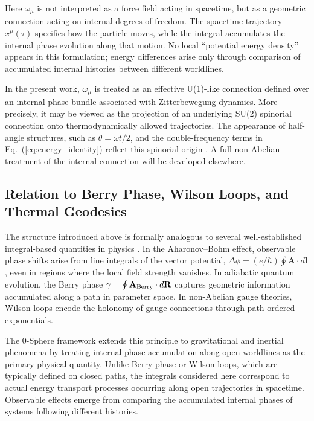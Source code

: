 \documentclass[%
 reprint,
 amsmath,amssymb,
 aps,
 prb,
]{revtex4-2}
\numberwithin{equation}{section}
\begin{document}
Here $\omega_\mu$ is not interpreted as a force field acting in spacetime, but as a geometric connection acting on internal degrees of freedom. The spacetime trajectory $x^\mu(\tau)$ specifies how the particle moves, while the integral accumulates the internal phase evolution along that motion. No local ``potential energy density'' appears in this formulation; energy differences arise only through comparison of accumulated internal histories between different worldlines.

In the present work, $\omega_\mu$ is treated as an effective U(1)-like connection defined over an internal phase bundle associated with Zitterbewegung dynamics. More precisely, it may be viewed as the projection of an underlying SU(2) spinorial connection onto thermodynamically allowed trajectories. The appearance of half-angle structures, such as $\theta = \omega t/2$, and the double-frequency terms in Eq.~(\ref{eq:energy_identity}) reflect this spinorial origin \cite{Hanamura2025ThermalGeod}. A full non-Abelian treatment of the internal connection will be developed elsewhere.

\subsection{Relation to Berry Phase, Wilson Loops, and Thermal Geodesics}

The structure introduced above is formally analogous to several well-established integral-based quantities in physics \cite{Hanamura2026LineIntegrals}. In the Aharonov--Bohm effect, observable phase shifts arise from line integrals of the vector potential, $\Delta\phi = (e/\hbar)\oint \mathbf{A}\cdot d\mathbf{l}$, even in regions where the local field strength vanishes. In adiabatic quantum evolution, the Berry phase $\gamma = \oint \mathbf{A}_{\rm Berry}\cdot d\mathbf{R}$ captures geometric information accumulated along a path in parameter space. In non-Abelian gauge theories, Wilson loops encode the holonomy of gauge connections through path-ordered exponentials.

The 0-Sphere framework extends this principle to gravitational and inertial phenomena by treating internal phase accumulation along open worldlines as the primary physical quantity. Unlike Berry phase or Wilson loops, which are typically defined on closed paths, the integrals considered here correspond to actual energy transport processes occurring along open trajectories in spacetime. Observable effects emerge from comparing the accumulated internal phases of systems following different histories.
\end{document}
